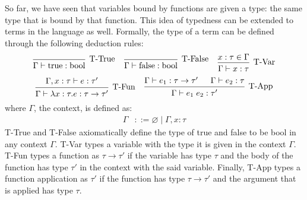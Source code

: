 \documentclass[12pt, letterpaper]{article}
\begin{document}
So far, we have seen that variables bound by functions are given a type: the same type that is bound by that function. This idea of typedness can be extended to terms in the language as well. Formally, the type of a term can be defined through the following deduction rules:
\[
\begin{prooftree}
\infer0[T-True]{\Gamma \vdash \text{true} : \text{bool}}	
\end{prooftree}
\;\;\;\;
\begin{prooftree}
\infer0[T-False]{\Gamma \vdash \text{false} : \text{bool}}
\end{prooftree}
\;\;\;\;
\begin{prooftree}
\hypo{x : \tau \in \Gamma}
\infer1[T-Var]{\Gamma \vdash x : \tau}
\end{prooftree}
\]
\[
\begin{prooftree}
\hypo{\Gamma, x : \tau \vdash e : \tau'}
\infer1[T-Fun]{\Gamma \vdash \lambda x : \tau . e : \tau \to \tau'}
\end{prooftree}
\;\;\;\;
\begin{prooftree}
\hypo{\Gamma \vdash e_1 : \tau \to \tau'}
\hypo{\Gamma \vdash e_2 : \tau}
\infer2[T-App]{\Gamma \vdash e_1\;e_2 : \tau'}
\end{prooftree}
\]
where $\Gamma$, the context, is defined as:
\begin{align*}
\Gamma &::= \varnothing\;|\;\Gamma, x : \tau
\end{align*}
T-True and T-False axiomatically define the type of true and false to be bool in any context $\Gamma$. T-Var types a variable with the type it is given in the context $\Gamma$. T-Fun types a function as $\tau \to \tau'$ if the variable has type $\tau$ and the body of the function has type $\tau'$ in the context with the said variable. Finally, T-App types a function application as $\tau'$ if the function has type $\tau \to \tau'$ and the argument that is applied has type $\tau$.
\end{document}
